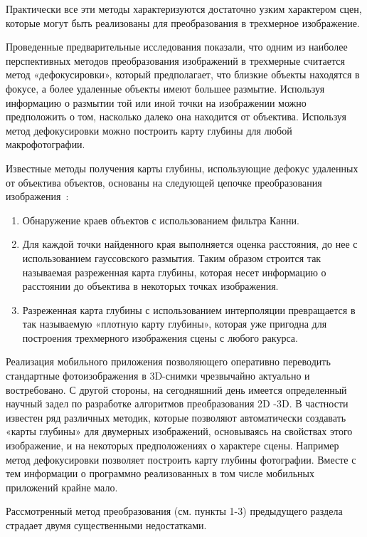 Практически все эти методы характеризуются достаточно узким характером сцен, которые могут быть реализованы для преобразования в трехмерное изображение. 

Проведенные предварительные исследования показали, что одним из наиболее перспективных методов преобразования изображений в трехмерные считается метод «дефокусировки», который предполагает, что близкие объекты находятся в фокусе, а более удаленные объекты имеют большее размытие. Используя информацию о размытии той или иной точки на изображении можно предположить о том, насколько далеко она находится от объектива. Используя метод дефокусировки можно построить карту глубины для любой макрофотографии. 

Известные методы получения карты глубины, использующие дефокус удаленных от объектива объектов, основаны на следующей цепочке преобразования изображения~\cite{depthMap1}:

\begin{enumerate} 
	\item Обнаружение краев объектов с использованием фильтра Канни.
	\item Для каждой точки найденного края выполняется оценка расстояния, до нее с использованием гауссовского размытия. Таким образом строится так называемая разреженная карта глубины, которая несет информацию о расстоянии до объектива в некоторых точках изображения. 
	\item Разреженная карта глубины с использованием интерполяции превращается в так называемую «плотную карту глубины», которая уже пригодна для построения трехмерного изображения сцены с любого ракурса. 
\end{enumerate}

Реализация мобильного приложения позволяющего оперативно переводить стандартные фотоизображения в 3D-снимки чрезвычайно актуально и востребовано. С другой стороны, на сегодняшний день имеется определенный научный задел по разработке алгоритмов преобразования 2D -3D. В частности известен ряд различных методик, которые позволяют автоматически создавать «карты глубины» для двумерных изображений, основываясь на свойствах этого изображение, и на некоторых предположениях о характере сцены. Например метод дефокусировки позволяет построить карту глубины фотографии. Вместе с тем информации о программно реализованных в том числе мобильных приложений крайне мало. 

Рассмотренный метод преобразования (см. пункты 1-3) предыдущего раздела страдает двумя существенными недостатками\cite{depthMap2}.

